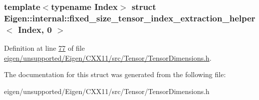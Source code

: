 \subsubsection*{template$<$typename Index$>$\newline
struct Eigen\+::internal\+::fixed\+\_\+size\+\_\+tensor\+\_\+index\+\_\+extraction\+\_\+helper$<$ Index, 0 $>$}



Definition at line \hyperlink{eigen_2unsupported_2_eigen_2_c_x_x11_2src_2_tensor_2_tensor_dimensions_8h_source_l00077}{77} of file \hyperlink{eigen_2unsupported_2_eigen_2_c_x_x11_2src_2_tensor_2_tensor_dimensions_8h_source}{eigen/unsupported/\+Eigen/\+C\+X\+X11/src/\+Tensor/\+Tensor\+Dimensions.\+h}.



The documentation for this struct was generated from the following file\+:\begin{DoxyCompactItemize}
\item 
eigen/unsupported/\+Eigen/\+C\+X\+X11/src/\+Tensor/\+Tensor\+Dimensions.\+h\end{DoxyCompactItemize}
